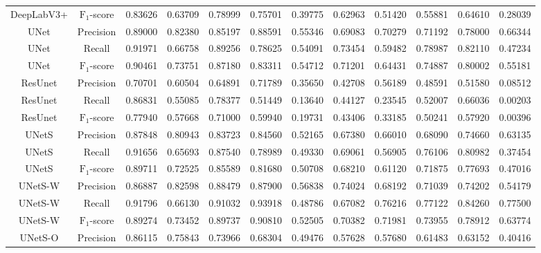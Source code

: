 \begin{table}[H]
{\begin{tabular}{cccccccccccc}
            DeepLabV3+ & $\mathrm{F_{1}}$-score & 0.83626 & 0.63709 & 0.78999 & 0.75701 & 0.39775 & 0.62963 & 0.51420 & 0.55881 & 0.64610 & 0.28039 \\
            UNet       & Precision              & 0.89000 & 0.82380 & 0.85197 & 0.88591 & 0.55346 & 0.69083 & 0.70279 & 0.71192 & 0.78000 & 0.66344 \\
            UNet       & Recall                 & 0.91971 & 0.66758 & 0.89256 & 0.78625 & 0.54091 & 0.73454 & 0.59482 & 0.78987 & 0.82110 & 0.47234 \\
            UNet       & $\mathrm{F_{1}}$-score & 0.90461 & 0.73751 & 0.87180 & 0.83311 & 0.54712 & 0.71201 & 0.64431 & 0.74887 & 0.80002 & 0.55181 \\
            ResUnet    & Precision              & 0.70701 & 0.60504 & 0.64891 & 0.71789 & 0.35650 & 0.42708 & 0.56189 & 0.48591 & 0.51580 & 0.08512 \\
            ResUnet    & Recall                 & 0.86831 & 0.55085 & 0.78377 & 0.51449 & 0.13640 & 0.44127 & 0.23545 & 0.52007 & 0.66036 & 0.00203 \\
            ResUnet    & $\mathrm{F_{1}}$-score & 0.77940 & 0.57668 & 0.71000 & 0.59940 & 0.19731 & 0.43406 & 0.33185 & 0.50241 & 0.57920 & 0.00396 \\
            UNetS      & Precision              & 0.87848 & 0.80943 & 0.83723 & 0.84560 & 0.52165 & 0.67380 & 0.66010 & 0.68090 & 0.74660 & 0.63135 \\
            UNetS      & Recall                 & 0.91656 & 0.65693 & 0.87540 & 0.78989 & 0.49330 & 0.69061 & 0.56905 & 0.76106 & 0.80982 & 0.37454 \\
            UNetS      & $\mathrm{F_{1}}$-score & 0.89711 & 0.72525 & 0.85589 & 0.81680 & 0.50708 & 0.68210 & 0.61120 & 0.71875 & 0.77693 & 0.47016 \\
            UNetS-W    & Precision              & 0.86887 & 0.82598 & 0.88479 & 0.87900 & 0.56838 & 0.74024 & 0.68192 & 0.71039 & 0.74202 & 0.54179 \\
            UNetS-W    & Recall                 & 0.91796 & 0.66130 & 0.91032 & 0.93918 & 0.48786 & 0.67082 & 0.76216 & 0.77122 & 0.84260 & 0.77500 \\
            UNetS-W    & $\mathrm{F_{1}}$-score & 0.89274 & 0.73452 & 0.89737 & 0.90810 & 0.52505 & 0.70382 & 0.71981 & 0.73955 & 0.78912 & 0.63774 \\
            UNetS-O    & Precision              & 0.86115 & 0.75843 & 0.73966 & 0.68304 & 0.49476 & 0.57628 & 0.57680 & 0.61483 & 0.63152 & 0.40416 \\

\end{tabular}}
\end{table}
